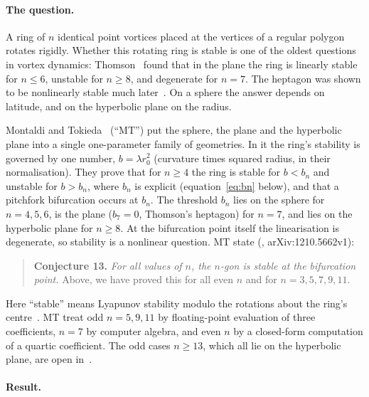 \documentclass[11pt]{article}
\numberwithin{equation}{section}
\theoremstyle{definition}
\theoremstyle{remark}
\begin{document}
\paragraph{The question.} A ring of $n$ identical point vortices placed at the vertices of a regular
polygon rotates rigidly. Whether this rotating ring is stable is one of the oldest questions in vortex
dynamics: Thomson~\cite{Thomson} found that in the plane the ring is linearly stable for $n\le6$, unstable
for $n\ge8$, and degenerate for $n=7$. The heptagon was shown to be nonlinearly stable much
later~\cite{KY,Schmidt}. On a sphere the answer depends on latitude, and on the hyperbolic plane on the
radius.

Montaldi and Tokieda~\cite{MT} (``MT'') put the sphere, the plane and the hyperbolic plane into a single
one-parameter family of geometries. In it the ring's stability is governed by one number,
$b=\lambda r_0^2$ (curvature times squared radius, in their normalisation). They prove that for $n\ge4$
the ring is stable for $b<b_n$ and unstable for $b>b_n$, where $b_n$ is explicit (equation~\eqref{eq:bn}
below), and that a pitchfork bifurcation occurs at $b_n$. The threshold $b_n$ lies on the sphere for
$n=4,5,6$, is the plane ($b_7=0$, Thomson's heptagon) for $n=7$, and lies on the hyperbolic plane for
$n\ge8$. At the bifurcation point itself the linearisation is degenerate, so stability is a nonlinear
question. MT state (\cite[p.~23]{MT}, arXiv:1210.5662v1):

\begin{quote}
\textbf{Conjecture 13.} \emph{For all values of $n$, the $n$-gon is stable at the bifurcation point.}
Above, we have proved this for all even $n$ and for $n=3,5,7,9,11$.
\end{quote}

Here ``stable'' means Lyapunov stability modulo the rotations about the ring's centre~\cite[pp.~10,
15]{MT}. MT treat odd $n=5,9,11$ by floating-point evaluation of three coefficients, $n=7$ by computer
algebra, and even $n$ by a closed-form computation of a quartic coefficient. The odd cases $n\ge13$, which
all lie on the hyperbolic plane, are open in~\cite{MT}.

\paragraph{Result.}
\end{document}
